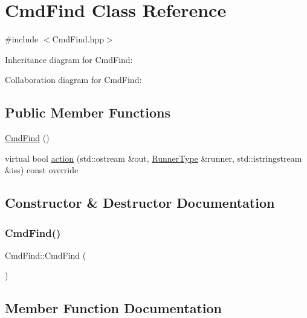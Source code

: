 \hypertarget{classCmdFind}{}\section{Cmd\+Find Class Reference}
\label{classCmdFind}


{\ttfamily \#include $<$Cmd\+Find.\+hpp$>$}



Inheritance diagram for Cmd\+Find\+:


Collaboration diagram for Cmd\+Find\+:
\subsection*{Public Member Functions}
\begin{DoxyCompactItemize}
\item 
\hyperlink{classCmdFind_aa13a72495b6e4d97213abe69541a9d0c}{Cmd\+Find} ()
\item 
virtual bool \hyperlink{classCmdFind_a113977b5959b9d2014a3a47b3f42340e}{action} (std\+::ostream \&out, \hyperlink{Command_8hpp_ad45c3de597c2023a8be0399d914161f4}{Runner\+Type} \&runner, std\+::istringstream \&iss) const override
\end{DoxyCompactItemize}


\subsection{Constructor \& Destructor Documentation}
\mbox{\label{classCmdFind_aa13a72495b6e4d97213abe69541a9d0c}} 
\subsubsection{\texorpdfstring{Cmd\+Find()}{CmdFind()}}
{\footnotesize\ttfamily Cmd\+Find\+::\+Cmd\+Find (\begin{DoxyParamCaption}{ }\end{DoxyParamCaption})}



\subsection{Member Function Documentation}
\mbox{\label{classCmdFind_a113977b5959b9d2014a3a47b3f42340e}} 
